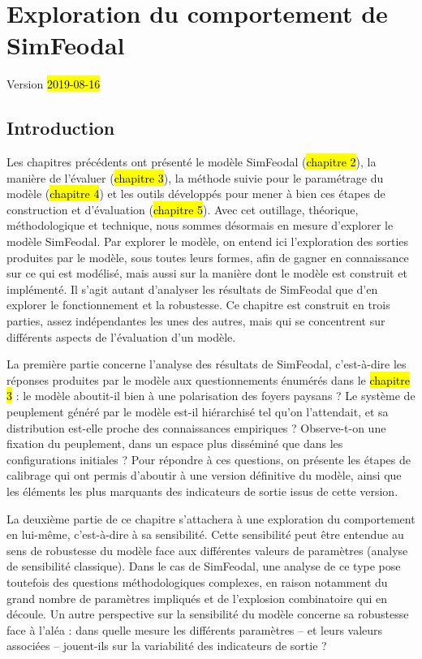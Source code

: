 \chapter{Exploration du comportement de SimFeodal}
\label{chap:chap6}
\begin{center}
	{\large Version \hl{2019-08-16}}
\end{center}
\minitoc

\clearpage
\section*{Introduction}

Les chapitres précédents ont présenté le modèle SimFeodal (\hl{chapitre 2}), la manière de l'évaluer (\hl{chapitre 3}), la méthode suivie pour le paramétrage du modèle (\hl{chapitre 4}) et les outils développés pour mener à bien ces étapes de construction et d'évaluation (\hl{chapitre 5}).
Avec cet outillage, théorique, méthodologique et technique, nous sommes désormais en mesure d'explorer le modèle SimFeodal.
Par \og explorer le modèle\fg{}, on entend ici l'exploration des sorties produites par le modèle, sous toutes leurs formes, afin de gagner en connaissance sur ce qui est modélisé, mais aussi sur la manière dont le modèle est construit et implémenté.
Il s'agit autant d'analyser les \og résultats\fg{} de SimFeodal que d'en explorer le fonctionnement et la robustesse.
Ce chapitre est construit en trois parties, assez indépendantes les unes des autres, mais qui se concentrent sur différents aspects de l'évaluation d'un modèle.

La première partie concerne l'analyse des \og résultats\fg{} de SimFeodal, c'est-à-dire les réponses produites par le modèle aux questionnements énumérés dans le \hl{chapitre 3} :
le modèle aboutit-il bien à une polarisation des foyers paysans ?
Le système de peuplement généré par le modèle est-il hiérarchisé tel qu'on l'attendait, et sa distribution est-elle proche des connaissances empiriques ?
Observe-t-on une fixation du peuplement, dans un espace plus disséminé que dans les configurations initiales ?
Pour répondre à ces questions, on présente les étapes de calibrage qui ont permis d'aboutir à une version \og définitive\fg{} du modèle, ainsi que les éléments les plus marquants des indicateurs de sortie issus de cette version.

La deuxième partie de ce chapitre s'attachera à une exploration du comportement en lui-même, c'est-à-dire à sa sensibilité.
Cette sensibilité peut être entendue au sens de robustesse du modèle face aux différentes valeurs de paramètres (analyse de sensibilité classique).
Dans le cas de SimFeodal, une analyse de ce type pose toutefois des questions méthodologiques complexes, en raison notamment du grand nombre de paramètres impliqués et de \og l'explosion combinatoire\fg{} qui en découle.
Un autre perspective sur la sensibilité du modèle concerne sa robustesse face à l'aléa : dans quelle mesure les différents paramètres -- et leurs valeurs associées -- jouent-ils sur la variabilité des indicateurs de sortie ?

